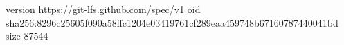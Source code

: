 version https://git-lfs.github.com/spec/v1
oid sha256:8296c25605f090a58ffc1204e03419761cf289eaa459748b67160787440041bd
size 87544
